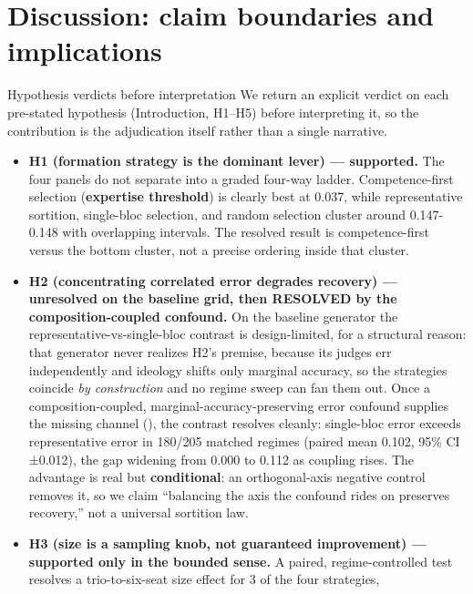 \documentclass[
  ignorenonframetext,
]{beamer}
\author{\texorpdfstring{}{}}
\date{}
\providecommand{\tightlist}{%
  \setlength{\itemsep}{0pt}\setlength{\parskip}{0pt}}
\begin{document}
\section{Discussion: claim boundaries and
implications}\label{discussion-claim-boundaries-and-implications}

\begin{frame}{Hypothesis verdicts before
interpretation}
\protect{}\label{hypothesis-verdicts-before-interpretation}
We return an explicit verdict on each pre-stated hypothesis
(Introduction, H1--H5) before interpreting it, so the contribution is
the adjudication itself rather than a single narrative.

\begin{itemize}
\tightlist
\item
  \textbf{H1 (formation strategy is the dominant lever) --- supported.}
  The four panels do not separate into a graded four-way ladder.
  Competence-first selection (\textbf{expertise threshold}) is clearly
  best at 0.037, while representative sortition, single-bloc selection,
  and random selection cluster around 0.147-0.148 with overlapping
  intervals. The resolved result is competence-first versus the bottom
  cluster, not a precise ordering inside that cluster.
\item
  \textbf{H2 (concentrating correlated error degrades recovery) ---
  unresolved on the baseline grid, then RESOLVED by the
  composition-coupled confound.} On the baseline generator the
  representative-vs-single-bloc contrast is design-limited, for a
  structural reason: that generator never realizes H2's premise, because
  its judges err independently and ideology shifts only marginal
  accuracy, so the strategies coincide \emph{by construction} and no
  regime sweep can fan them out. Once a composition-coupled,
  marginal-accuracy-preserving error confound supplies the missing
  channel (), the contrast resolves cleanly:
  single-bloc error exceeds representative error in 180/205 matched
  regimes (paired mean 0.102, 95\% CI ±0.012), the gap widening from
  0.000 to 0.112 as coupling rises. The advantage is real but
  \textbf{conditional}: an orthogonal-axis negative control removes it,
  so we claim ``balancing the axis the confound rides on preserves
  recovery,'' not a universal sortition law.
\item
  \textbf{H3 (size is a sampling knob, not guaranteed improvement) ---
  supported only in the bounded sense.} A paired, regime-controlled test
  resolves a trio-to-six-seat size effect for 3 of the four strategies,

\end{itemize}
\end{frame}
\end{document}
